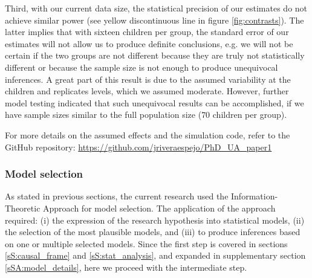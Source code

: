 Third, with our current data size, the statistical precision of our estimates do not achieve similar power (see yellow discontinuous line in figure \ref{fig:contrasts}). The latter implies that with sixteen children per group, the standard error of our estimates will not allow us to produce definite conclusions, e.g. we will not be certain if the two groups are not different because they are truly not statistically different or because the sample size is not enough to produce unequivocal inferences. A great part of this result is due to the assumed variability at the children and replicates levels, which we assumed moderate. However, further model testing indicated that such unequivocal results can be accomplished, if we have sample sizes similar to the full population size ($70$ children per group).
%
\begin{comment}
	The results of our simulations indicated that each statistical model was able to recover the `real' parameters values, when the sample size was similar to the population size.
	
	Third and final, no parameter (nor any contrast) managed to reject the null hypothesis or achieve high estimates precision with power above the $80\%$ threshold.
\end{comment}

For more details on the assumed effects and the simulation code, refer to the GitHub repository: \url{https://github.com/jriveraespejo/PhD_UA_paper1}
%
%
\subsubsection{Model selection} \label{ssSA:model_selection}
%
As stated in previous sections, the current research used the Information-Theoretic Approach \citep{Anderson_2008, Chamberlain_1965} for model selection. The application of the approach required: (i) the expression of the research hypothesis into statistical models, (ii) the selection of the most plausible models, and (iii) to produce inferences based on one or multiple selected models. Since the first step is covered in sections \ref{sS:causal_frame} and \ref{sS:stat_analysis}, and expanded in supplementary section \ref{sSA:model_details}, here we proceed with the intermediate step. 

